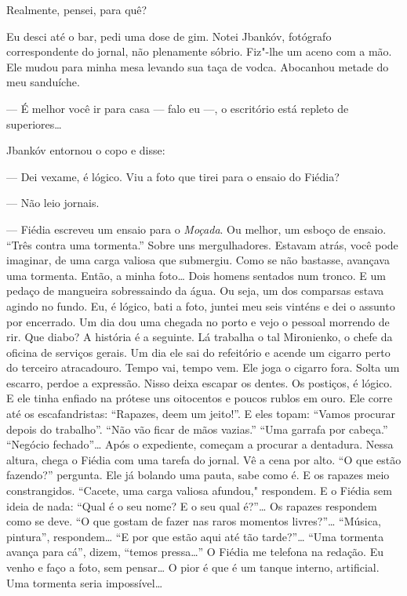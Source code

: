 Realmente, pensei, para quê?

Eu desci até o bar, pedi uma dose de gim. Notei Jbankóv, fotógrafo
correspondente do jornal, não plenamente sóbrio. Fiz"-lhe um aceno com a
mão. Ele mudou para minha mesa levando sua taça de vodca. Abocanhou
metade do meu sanduíche.

--- É melhor você ir para casa --- falo eu ---, o escritório está
repleto de superiores\ldots{}

Jbankóv entornou o copo e disse:

--- Dei vexame, é lógico. Viu a foto que tirei para o ensaio do Fiédia?

--- Não leio jornais.

--- Fiédia escreveu um ensaio para o \emph{Moçada}. Ou melhor, um esboço
de ensaio. ``Três contra uma tormenta.'' Sobre uns
mergulhadores. Estavam atrás, você pode imaginar, de uma carga valiosa
que submergiu. Como se não bastasse, avançava uma tormenta. Então, a
minha foto\ldots{} Dois homens sentados num tronco. E um pedaço de mangueira
sobressaindo da água. Ou seja, um dos comparsas estava agindo no fundo.
Eu, é lógico, bati a foto, juntei meu seis vinténs e dei o assunto por
encerrado. Um dia dou uma chegada no porto e vejo o pessoal morrendo de
rir. Que diabo? A história é a seguinte. Lá trabalha o tal Mironienko, o
chefe da oficina de serviços gerais. Um dia ele sai do refeitório e
acende um cigarro perto do terceiro atracadouro. Tempo vai, tempo vem.
Ele joga o cigarro fora. Solta um escarro, perdoe a expressão. Nisso
deixa escapar os dentes. Os postiços, é lógico. E ele tinha enfiado na
prótese uns oitocentos e poucos rublos em ouro. Ele corre até os
escafandristas: ``Rapazes, deem um jeito!''. E eles topam: ``Vamos
procurar depois do trabalho''. ``Não vão ficar de mãos vazias.'' ``Uma
garrafa por cabeça.'' ``Negócio fechado''\ldots{} Após o expediente, começam
a procurar a dentadura. Nessa altura, chega o Fiédia com uma tarefa do
jornal. Vê a cena por alto. ``O que estão fazendo?'' pergunta. Ele já
bolando uma pauta, sabe como é. E os rapazes meio constrangidos.
``Cacete, uma carga valiosa afundou," respondem. E o Fiédia sem ideia de
nada: ``Qual é o seu nome? E o seu qual é?''\ldots{} Os rapazes respondem
como se deve. ``O que gostam de fazer nas raros momentos livres?''\ldots{}
``Música, pintura'', respondem\ldots{} ``E por que estão aqui até tão
tarde?''\ldots{} ``Uma tormenta avança para cá'', dizem, ``temos pressa\ldots{}''
O Fiédia me telefona na redação. Eu venho e faço a foto, sem pensar\ldots{} O
pior é que é um tanque interno, artificial. Uma tormenta seria
impossível\ldots{}

